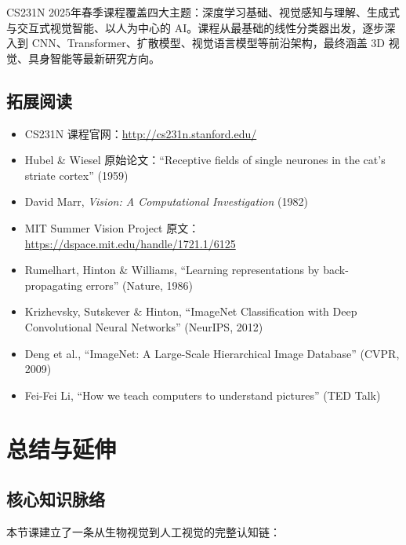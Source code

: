 \documentclass[a4paper]{article}
\begin{document}
CS231N 2025年春季课程覆盖四大主题：深度学习基础、视觉感知与理解、生成式与交互式视觉智能、以人为中心的 AI。课程从最基础的线性分类器出发，逐步深入到 CNN、Transformer、扩散模型、视觉语言模型等前沿架构，最终涵盖 3D 视觉、具身智能等最新研究方向。


\subsection{拓展阅读}

\begin{itemize}
    \item CS231N 课程官网：\url{http://cs231n.stanford.edu/}
    \item Hubel \& Wiesel 原始论文：``Receptive fields of single neurones in the cat's striate cortex'' (1959)
    \item David Marr, \textit{Vision: A Computational Investigation} (1982)
    \item MIT Summer Vision Project 原文：\url{https://dspace.mit.edu/handle/1721.1/6125}
    \item Rumelhart, Hinton \& Williams, ``Learning representations by back-propagating errors'' (Nature, 1986)
    \item Krizhevsky, Sutskever \& Hinton, ``ImageNet Classification with Deep Convolutional Neural Networks'' (NeurIPS, 2012)
    \item Deng et al., ``ImageNet: A Large-Scale Hierarchical Image Database'' (CVPR, 2009)
    \item Fei-Fei Li, ``How we teach computers to understand pictures'' (TED Talk)
\end{itemize}


\section{总结与延伸}

\subsection{核心知识脉络}

本节课建立了一条从生物视觉到人工视觉的完整认知链：
\end{document}
